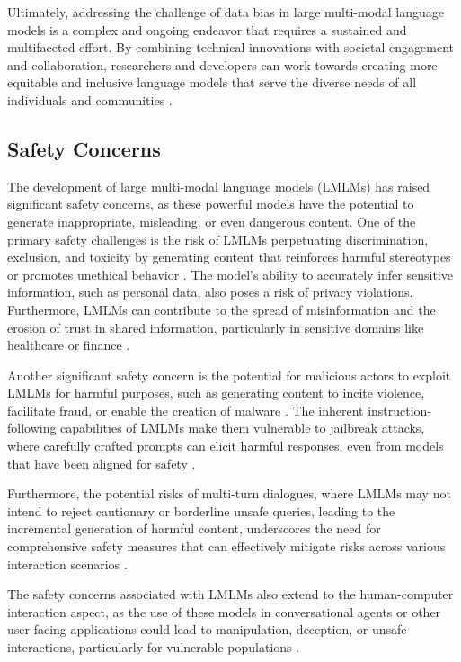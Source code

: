 \documentclass[11pt]{article}
\begin{document}
Ultimately, addressing the challenge of data bias in large multi-modal language models is a complex and ongoing endeavor that requires a sustained and multifaceted effort. By combining technical innovations with societal engagement and collaboration, researchers and developers can work towards creating more equitable and inclusive language models that serve the diverse needs of all individuals and communities \cite{ref187}.

\subsection{Safety Concerns}

The development of large multi-modal language models (LMLMs) has raised significant safety concerns, as these powerful models have the potential to generate inappropriate, misleading, or even dangerous content. One of the primary safety challenges is the risk of LMLMs perpetuating discrimination, exclusion, and toxicity by generating content that reinforces harmful stereotypes or promotes unethical behavior \cite{ref103}. The model's ability to accurately infer sensitive information, such as personal data, also poses a risk of privacy violations. Furthermore, LMLMs can contribute to the spread of misinformation and the erosion of trust in shared information, particularly in sensitive domains like healthcare or finance \cite{ref103}.

Another significant safety concern is the potential for malicious actors to exploit LMLMs for harmful purposes, such as generating content to incite violence, facilitate fraud, or enable the creation of malware \cite{ref325}. The inherent instruction-following capabilities of LMLMs make them vulnerable to jailbreak attacks, where carefully crafted prompts can elicit harmful responses, even from models that have been aligned for safety \cite{ref326}.

Furthermore, the potential risks of multi-turn dialogues, where LMLMs may not intend to reject cautionary or borderline unsafe queries, leading to the incremental generation of harmful content, underscores the need for comprehensive safety measures that can effectively mitigate risks across various interaction scenarios \cite{ref327}.

The safety concerns associated with LMLMs also extend to the human-computer interaction aspect, as the use of these models in conversational agents or other user-facing applications could lead to manipulation, deception, or unsafe interactions, particularly for vulnerable populations \cite{ref103}.
\end{document}
